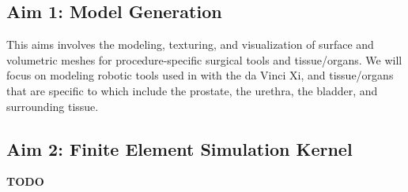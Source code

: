 \subsection{Aim 1: Model Generation}

This aims involves the modeling, texturing, and visualization of  surface and volumetric meshes for procedure-specific surgical tools and tissue/organs. We will focus on modeling robotic tools used in  with the da Vinci Xi, and tissue/organs that are specific to   which include the prostate, the urethra, the bladder, and surrounding tissue.

\subsection{Aim 2: Finite Element Simulation Kernel}

\textbf{TODO}


